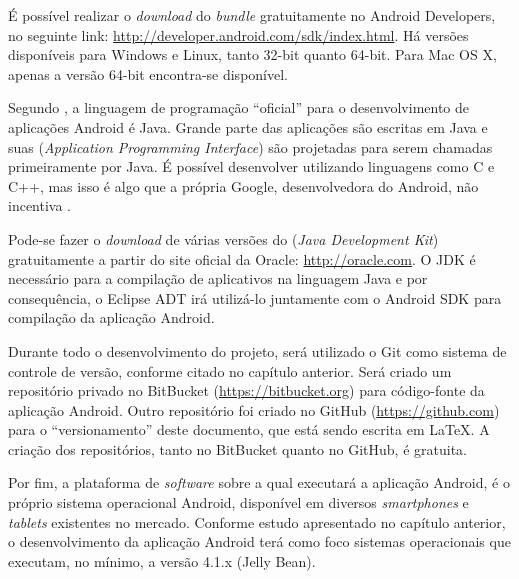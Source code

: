 É possível realizar o \textit{download} do \textit{bundle} gratuitamente no Android Developers, no seguinte link: \url{http://developer.android.com/sdk/index.html}. Há versões disponíveis para Windows e Linux, tanto 32-bit quanto 64-bit. Para Mac OS X, apenas a versão 64-bit encontra-se disponível.


Segundo , a linguagem de programação ``oficial'' para o desenvolvimento de aplicações Android é Java. Grande parte das aplicações são escritas em Java e suas  (\textit{Application Programming Interface}) são projetadas para serem chamadas primeiramente por Java. É possível desenvolver utilizando linguagens como C e C++, mas isso é algo que a própria Google, desenvolvedora do Android, não incentiva \cite{garySims}.

Pode-se fazer o \textit{download} de várias versões do  (\textit{Java Development Kit}) gratuitamente a partir do site oficial da Oracle: \url{http://oracle.com}. O JDK é necessário para a compilação de aplicativos na linguagem Java e por consequência, o Eclipse ADT irá utilizá-lo juntamente com o Android SDK para compilação da aplicação Android.

Durante todo o desenvolvimento do projeto, será utilizado o Git como sistema de controle de versão, conforme citado no capítulo anterior. Será criado um repositório privado no BitBucket (\url{https://bitbucket.org}) para código-fonte da aplicação Android. Outro repositório foi criado no GitHub (\url{https://github.com}) para o ``versionamento'' deste documento, que está sendo escrita em LaTeX. A criação dos repositórios, tanto no BitBucket quanto no GitHub, é gratuita.

Por fim, a plataforma de \textit{software} sobre a qual executará a aplicação Android, é o próprio sistema operacional Android, disponível em diversos \textit{smartphones} e \textit{tablets} existentes no mercado. Conforme estudo apresentado no capítulo anterior, o desenvolvimento da aplicação Android terá como foco sistemas operacionais que executam, no mínimo, a versão 4.1.x (Jelly Bean).